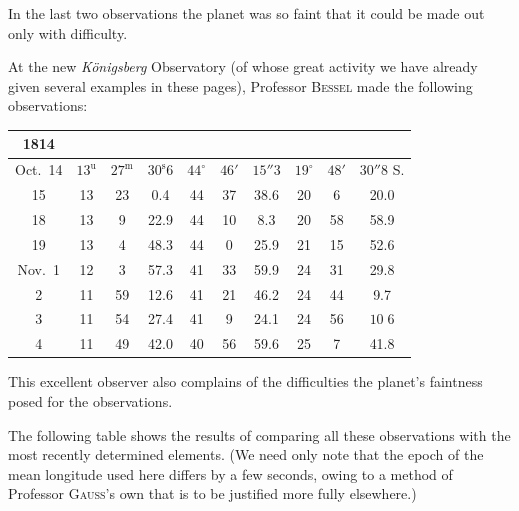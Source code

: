 \par\indent In the last two observations the planet was so faint that it could be made out only with difficulty.

\par\indent At the new \emph{Königsberg} Observatory (of whose great activity we have already given several examples in these pages), Professor \textsc{Bessel} made the following observations:

\begin{center}\fontsize{9}{11}\selectfont\setlength{\tabcolsep}{3pt}\renewcommand{\arraystretch}{1.15}\begin{tabular}{c|ccc|ccc|ccc}
1814 &  &  &  \\
\hline
Oct.\ 14 & $13^{\mathrm u}$ & $27^{\mathrm m}$ & $30^{\mathrm s}6$ & $44^{\circ}$ & $46'$ & $15''3$ & $19^{\circ}$ & $48'$ & $30''8$ S. \\
15         & 13 & 23 & 0.4  & 44 & 37 & 38.6 & 20 & 6  & 20.0 \\
18         & 13 & 9  & 22.9 & 44 & 10 & 8.3  & 20 & 58 & 58.9 \\
19         & 13 & 4  & 48.3 & 44 & 0  & 25.9 & 21 & 15 & 52.6 \\
Nov.\ 1    & 12 & 3  & 57.3 & 41 & 33 & 59.9 & 24 & 31 & 29.8 \\
2          & 11 & 59 & 12.6 & 41 & 21 & 46.2 & 24 & 44 & 9.7  \\
3          & 11 & 54 & 27.4 & 41 & 9  & 24.1 & 24 & 56 & $10\;6$ \\
4          & 11 & 49 & 42.0 & 40 & 56 & 59.6 & 25 & 7  & 41.8 \\
\end{tabular}\end{center}

\par\indent This excellent observer also complains of the difficulties the planet’s faintness posed for the observations.

\par\indent The following table shows the results of comparing all these observations with the most recently determined elements. (We need only note that the epoch of the mean longitude used here differs by a few seconds, owing to a method of Professor \textsc{Gauss}’s own that is to be justified more fully elsewhere.)

